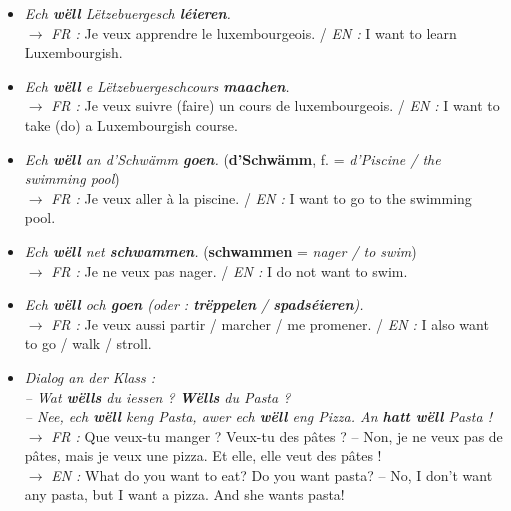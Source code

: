 \begin{itemize}
    \item \textit{Ech \textbf{wëll} Lëtzebuergesch \textbf{léieren}.} \\
    $\rightarrow$ \textit{FR :} Je veux apprendre le luxembourgeois. / \textit{EN :} I want to learn Luxembourgish.
    \item \textit{Ech \textbf{wëll} e Lëtzebuergeschcours \textbf{maachen}.} \\
    $\rightarrow$ \textit{FR :} Je veux suivre (faire) un cours de luxembourgeois. / \textit{EN :} I want to take (do) a Luxembourgish course.
    \item \textit{Ech \textbf{wëll} an d'Schwämm \textbf{goen}.} (\textbf{d'Schwämm}, f. = \textit{d'Piscine / the swimming pool}) \\
    $\rightarrow$ \textit{FR :} Je veux aller à la piscine. / \textit{EN :} I want to go to the swimming pool.
    \item \textit{Ech \textbf{wëll} net \textbf{schwammen}.} (\textbf{schwammen} = \textit{nager / to swim}) \\
    $\rightarrow$ \textit{FR :} Je ne veux pas nager. / \textit{EN :} I do not want to swim.
    \item \textit{Ech \textbf{wëll} och \textbf{goen} (oder : \textbf{trëppelen} / \textbf{spadséieren}).} \\
    $\rightarrow$ \textit{FR :} Je veux aussi partir / marcher / me promener. / \textit{EN :} I also want to go / walk / stroll.
    \item \textit{Dialog an der Klass :} \\
    \textit{-- Wat \textbf{wëlls} du iessen ? \textbf{Wëlls} du Pasta ?} \\
    \textit{-- Nee, ech \textbf{wëll} keng Pasta, awer ech \textbf{wëll} eng Pizza. An \textbf{hatt wëll} Pasta !} \\
    $\rightarrow$ \textit{FR :} Que veux-tu manger ? Veux-tu des pâtes ? -- Non, je ne veux pas de pâtes, mais je veux une pizza. Et elle, elle veut des pâtes ! \\
    $\rightarrow$ \textit{EN :} What do you want to eat? Do you want pasta? -- No, I don't want any pasta, but I want a pizza. And she wants pasta!
\end{itemize}

\vspace{1.5em}

